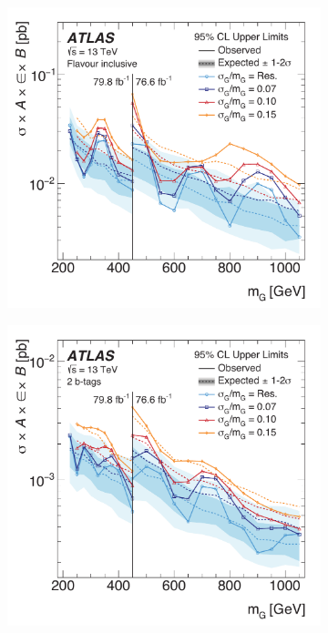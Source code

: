 \begin{figure}
  \centering
  \begin{subfigure}[b]{0.49\textwidth}
    \includegraphics[width=\textwidth]{figures/ISR_resolved/GenericGaussians_CombinedInc}
	  \caption{\label{fig:limit_gaussian_inc}}
  \end{subfigure}
  \begin{subfigure}[b]{0.49\textwidth}
    \includegraphics[width=\textwidth]{figures/ISR_resolved/GenericGaussians_Combined2b}

\end{subfigure}
\end{figure}

